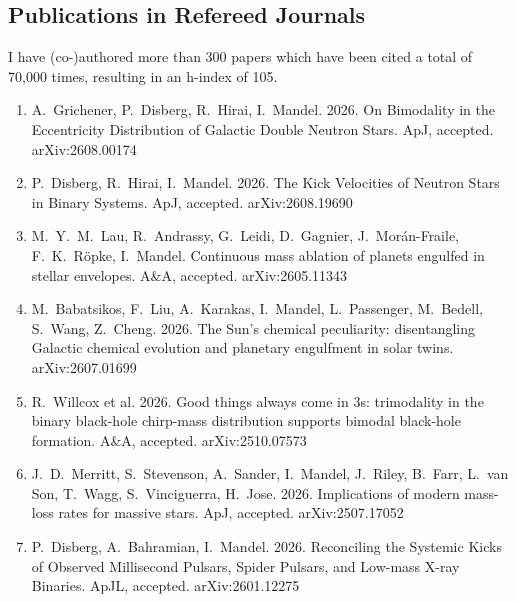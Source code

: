 \documentclass[margin,line]{res}
\begin{document}
\begin{resume}

\newpage

\section{\sc Publications in Refereed Journals}

I have (co-)authored more than 300 papers which have been cited a total of 70,000 times, resulting in an h-index of 105. 

\begin{enumerate}

\item A.~Grichener, P.~Disberg, R.~Hirai, I.~Mandel. 2026. On Bimodality in the Eccentricity Distribution of Galactic Double Neutron Stars. ApJ, accepted. arXiv:2608.00174

\item P.~Disberg, R.~Hirai, I.~Mandel. 2026. The Kick Velocities of Neutron Stars in Binary Systems. ApJ, accepted. arXiv:2608.19690

\item M.~Y.~M.~Lau, R.~Andrassy, G.~Leidi, D.~Gagnier, J.~Morán-Fraile, F.~K.~Röpke, I.~Mandel. Continuous mass ablation of planets engulfed in stellar envelopes.   A\&A, accepted.  arXiv:2605.11343

\item M.~Babatsikos, F.~Liu, A.~Karakas, I.~Mandel, L.~Passenger, M.~Bedell, S.~Wang, Z.~Cheng.  2026. The Sun's chemical peculiarity: disentangling Galactic chemical evolution and planetary engulfment in solar twins.  arXiv:2607.01699

\item R.~Willcox et al.  2026.  Good things always come in 3s: trimodality in the binary black-hole chirp-mass distribution supports bimodal black-hole formation.  A\&A, accepted.  arXiv:2510.07573

\item J.~D.~Merritt, S.~Stevenson, A.~Sander, I.~Mandel, J.~Riley, B.~Farr, L.~van Son, T.~Wagg, S.~Vinciguerra, H.~Jose.  2026.  Implications of modern mass-loss rates for massive stars.  ApJ, accepted.  arXiv:2507.17052

\item P.~Disberg, A.~Bahramian, I.~Mandel. 2026.  Reconciling the Systemic Kicks of Observed Millisecond Pulsars, Spider Pulsars, and Low-mass X-ray Binaries.  ApJL, accepted.  arXiv:2601.12275


\end{enumerate}
\end{resume}
\end{document}
